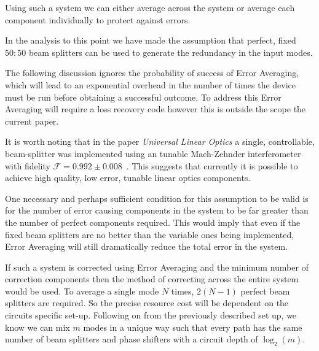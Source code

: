 \documentclass[aps,pra,twocolumn,superscriptaddress,numerical,floatfix]{revtex4-1}
\begin{document}
Using such a system we can either average across the system or average each component individually to protect against errors.

In the analysis to this point we have made the assumption that perfect, fixed $50:50$ beam splitters can be used to generate the redundancy in the input modes.  

The following discussion ignores the probability of success of Error Averaging, which will lead to an exponential overhead in the number of times the device must be run before obtaining a successful outcome.  To address this Error Averaging will require a loss recovery code \cite{OQC} however this is outside the scope the current paper. 

It is worth noting that in the paper \textit{Universal Linear Optics} a single, controllable, beam-splitter was implemented using an tunable Mach-Zehnder interferometer with fidelity $\mathcal{F}=0.992\pm0.008$~\cite{ULO}.
This suggests that currently it is possible to achieve high quality, low error, tunable linear optics components. 

One necessary and perhaps sufficient condition for this assumption to be valid is for the number of error causing components in the system to be far greater than the number of perfect components required. This would imply that even if the fixed beam splitters are no better than the variable ones being implemented, Error Averaging will still dramatically reduce the total error in the system.

If such a system is corrected using Error Averaging and the minimum number of correction components then the method of correcting across the entire system would be used. To average a single mode $N$ times, $2\left(N-1\right)$ perfect beam splitters are required. So the precise resource cost will be dependent on the circuits specific set-up. Following on from the previously described set up, we know we can mix $m$ modes in a unique way such that every path has the same number of beam splitters and phase shifters with a circuit depth of $\log_{2}\left(m\right)$.
\end{document}
